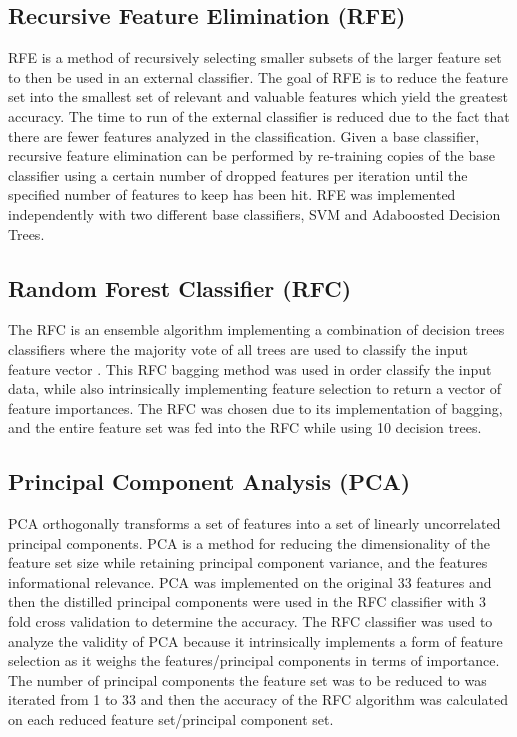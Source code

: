 \documentclass{article}\raggedbottom
\begin{document}
\subsection{Recursive Feature Elimination (RFE)}
RFE is a method of recursively selecting smaller subsets of the larger feature set to then be used in an external classifier. The goal of RFE is to reduce the feature set into the smallest set of relevant and valuable features which yield the greatest accuracy. The time to run of the external classifier is reduced due to the fact that there are fewer features analyzed in the classification.
Given a base classifier, recursive feature elimination can be performed by re-training copies of the base classifier using a certain number of dropped features per iteration until the specified number of features to keep has been hit. RFE was implemented independently with two different base classifiers, SVM and Adaboosted Decision Trees.

\subsection{Random Forest Classifier (RFC)}
The RFC is an ensemble algorithm implementing a combination of decision trees classifiers where the majority vote of all trees are used to classify the input feature vector \cite{pal2005random}. This RFC bagging method was used in order classify the input data, while also intrinsically implementing feature selection to return a vector of feature importances. The RFC was chosen due to its implementation of bagging, and the entire feature set was fed into the RFC while using 10 decision trees.

\subsection{Principal Component Analysis (PCA)}
PCA orthogonally transforms a set of features into a set of linearly uncorrelated principal components. PCA is a method for reducing the dimensionality of the feature set size while retaining principal component variance, and the features informational relevance. PCA was implemented on the original 33 features and then the distilled principal components were used in the RFC classifier with 3 fold cross validation to determine the accuracy. The RFC classifier was used to analyze the validity of PCA because it intrinsically implements a form of feature selection as it weighs the features/principal components in terms of importance. The number of principal components the feature set was to be reduced to was iterated from 1 to 33 and then the accuracy of the RFC algorithm was calculated on each reduced feature set/principal component set.
\end{document}
